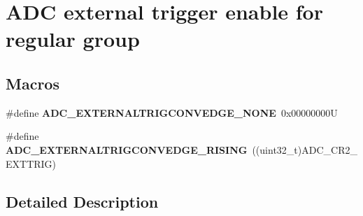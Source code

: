 \hypertarget{group___a_d_c___external__trigger__edge___regular}{}\section{A\+DC external trigger enable for regular group}
\label{group___a_d_c___external__trigger__edge___regular}
\subsection*{Macros}
\begin{DoxyCompactItemize}
\item 
\mbox{\label{group___a_d_c___external__trigger__edge___regular_gab2e3a19c05441925f9b9a482238994ac}} 
\#define {\bfseries A\+D\+C\+\_\+\+E\+X\+T\+E\+R\+N\+A\+L\+T\+R\+I\+G\+C\+O\+N\+V\+E\+D\+G\+E\+\_\+\+N\+O\+NE}~0x00000000U
\item 
\mbox{\label{group___a_d_c___external__trigger__edge___regular_ga0aaa4e876de630733ca4ca4116b9608e}} 
\#define {\bfseries A\+D\+C\+\_\+\+E\+X\+T\+E\+R\+N\+A\+L\+T\+R\+I\+G\+C\+O\+N\+V\+E\+D\+G\+E\+\_\+\+R\+I\+S\+I\+NG}~((uint32\+\_\+t)A\+D\+C\+\_\+\+C\+R2\+\_\+\+E\+X\+T\+T\+R\+IG)
\end{DoxyCompactItemize}


\subsection{Detailed Description}

